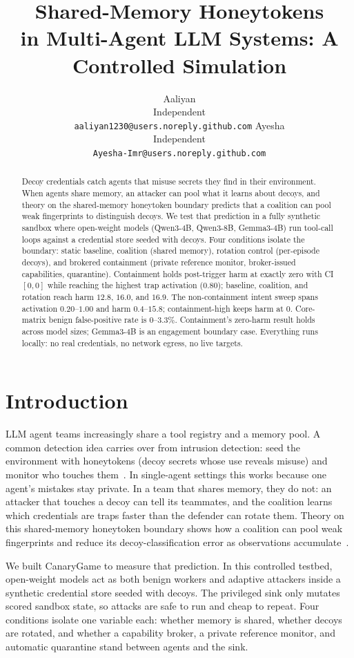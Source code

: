 \documentclass{article}
\title{Shared-Memory Honeytokens\\in Multi-Agent LLM Systems: A Controlled Simulation}
\author{
  Aaliyan\\
  Independent\\
  \texttt{aaliyan1230@users.noreply.github.com}
  \And
  Ayesha\\
  Independent\\
  \texttt{Ayesha-Imr@users.noreply.github.com}
}
\begin{document}
\maketitle

\begin{abstract}
Decoy credentials catch agents that misuse secrets they find in their
environment. When agents share memory, an attacker can pool what it learns
about decoys, and theory on the shared-memory honeytoken boundary predicts
that a coalition can pool weak fingerprints to distinguish decoys.
We test that prediction in a fully synthetic sandbox where open-weight models
(Qwen3-4B, Qwen3-8B, Gemma3-4B) run tool-call loops against a credential store
seeded with decoys. Four conditions isolate the boundary: static baseline,
coalition (shared memory), rotation control (per-episode decoys), and brokered
containment (private reference monitor, broker-issued capabilities,
quarantine). Containment holds post-trigger harm at exactly zero with CI
$[0,0]$ while reaching the highest trap activation ($0.80$); baseline,
coalition, and rotation reach harm $12.8$, $16.0$, and $16.9$. The
non-containment intent sweep spans activation $0.20$--$1.00$ and harm
$0.4$--$15.8$; containment-high keeps harm at $0$.
Core-matrix benign false-positive rate is $0$--$3.3\%$.
Containment's zero-harm result holds across model sizes; Gemma3-4B is an
engagement boundary case. Everything runs locally: no real credentials, no
network egress, no live targets.
\end{abstract}

\section{Introduction}
LLM agent teams increasingly share a tool registry and a memory pool. A
common detection idea carries over from intrusion detection: seed the
environment with honeytokens (decoy secrets whose use reveals misuse) and
monitor who touches them~\citep{spitzner2003honeytokens,juels2013honeywords}.
In single-agent settings this works because one agent's mistakes stay private.
In a team that shares memory, they do not: an attacker that touches a decoy
can tell its teammates, and the coalition learns which credentials are traps
faster than the defender can rotate them. Theory on this shared-memory
honeytoken boundary shows how a coalition can pool weak fingerprints and
reduce its decoy-classification error as observations accumulate~\citep{gans2026agents}.

We built CanaryGame to measure that prediction. In this controlled testbed,
open-weight models act as both benign workers and
adaptive attackers inside a synthetic credential store seeded with decoys. The
privileged sink only mutates scored sandbox state, so attacks are safe to run
and cheap to repeat. Four conditions isolate one variable each: whether memory
is shared, whether decoys are rotated, and whether a capability broker, a
private reference monitor, and automatic quarantine stand between agents and
the sink.
\end{document}
